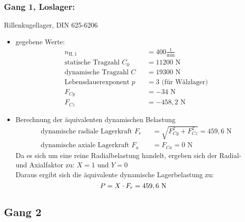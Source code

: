\subsubsection{Gang 1, Loslager:} Rillenkugellager, DIN 625-6206\\
\begin{itemize}
	\item gegebene Werte:
	\begin{align*}
	&n_{{\mathord{\mathrm{II}},1}} &&=  400 \frac{1}{\text{min}} \\
	&\text{statische Tragzahl } C_{0} &&= 11200 \text{ N}\\
	&\text{dynamische Tragzahl } C &&= 19300 \text{ N} \\
	&\text{Lebensdauerexponent } p &&= 3 \text{ (für Wälzlager)} \\
	&F_{Cy} && = -34 \text{ N}\\
	&F_{Cz} && = -458,2 \text{ N}
	\end{align*} 
	\item Berechnung der äquivalenten dynamischen Belastung
	\begin{align*}
	&\text{dynamische radiale Lagerkraft } F_r&& = \sqrt{F_{Cy}^2 + F_{Cz}^2 } = 459,6 \text{ N} \\
	&\text{dynamische axiale Lagerkraft } F_a&& = F_{Cx} = 0\text{ N}
	\end{align*} 
	Da es sich um eine reine Radialbelastung handelt, ergeben sich der Radial- und Axialfaktor zu: $X= 1$ und $Y=0$\\
	Daraus ergibt sich die äquivalente dynamische Lagerbelastung zu:  
	\[
	P= X \cdot F_r =459,6 \text{ N}
	\]
\end{itemize}
\newpage

\subsection{Gang 2}
